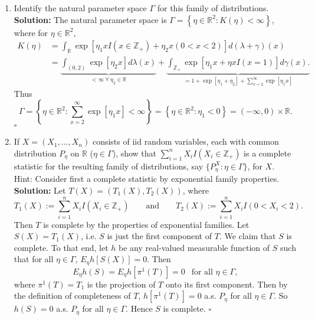 \documentclass[12pt]{article}
\newcounter{ProofCounter}
\newenvironment{Solution}{\stepcounter{ProofCounter}\textbf{Solution:}}{\hfill$\square$}
\begin{document}
\begin{enumerate}[leftmargin=0cm, itemindent=0cm]
\begin{enumerate}
\item Identify the natural parameter space $\Gamma$  for this family of distributions.\\

  \begin{Solution}
    The natural parameter space is $\Gamma = \left\{ \eta \in \mathbb{R}^{2} : K(\eta) < \infty \right\}$, where for $\eta \in \mathbb{R}^{2}$,
    \begin{align*}
      K(\eta) & = \int_{\mathbb{R}}\exp\left[ \eta_1 xI(x \in \mathbb{Z}_+) + \eta_2 x \left( 0 < x < 2\right)\right]d(\lambda + \gamma)(x) \\
      & = \underbrace{\int_{(0,2)}\exp\left[ \eta_2x \right]d\lambda(x)}_{< \infty \ \forall \ \eta_2 \in \mathbb{R}} + 
      \underbrace{\int_{\mathbb{Z}_+}\exp\left[ \eta_1x + \eta xI(x = 1) \right]d\gamma(x). }_{ = 1 + \exp\left[ \eta_1 + \eta_2 \right] +
      \sum_{x=2}^{\infty}\exp[\eta_1x]}
    \end{align*}
    Thus 
    \[ 
      \Gamma = \left\{ \eta \in \mathbb{R}^{2} : \sum_{x=2}^{\infty}\exp\left[ \eta_1 x \right] < \infty \right\} = 
      \left\{ \eta \in \mathbb{R}^{2} : \eta_1 < 0 \right\} = (-\infty, 0) \times \mathbb{R}.
    \]
  \end{Solution}


\item If $X=(X_1,\ldots,X_n)$ consists of iid random variables, each with common distribution $P_\eta$ on $ \mathbb{R}$ ($\eta \in \Gamma$), show that $\sum_{i=1}^n X_i I(X_i \in \mathbb{Z}_+)$ is a complete statistic for the resulting family of distributions, say $\{P^X_\eta: \eta \in \Gamma\}$, for $X$.\\
Hint: Consider first a complete statistic by exponential family properties. \\

\begin{Solution}
  Let $T(X) = (T_1(X), T_2(X))$, where 
  \[
    T_1(X) := \sum_{i=1}^{n}X_iI(X_i \in \mathbb{Z}_+) \qquad \text{and} \qquad T_2(X) := \sum_{i=1}^{n}X_iI(0 < X_i < 2).
  \]
  Then $T$ is complete by the properties of exponential families. Let $S(X) = T_1(X)$, i.e. $S$ is just the first component of $T$. We claim that $S$
  is complete. To that end, let $h$ be any real-valued measurable function of $S$ such that for all $\eta \in \Gamma$, $E_{\eta}h[S(X)] = 0$. Then 
  \[
    E_{\eta}h(S) = E_{\eta}h[\pi^{1}(T)] = 0 \ \ \text{ for all } \eta \in \Gamma,
  \]
  where $\pi^{1}(T) = T_1$ is the projection of $T$ onto its first component. Then by the definition of completeness of $T$, $h[\pi^{1}(T)] = 0$ a.s.
  $P_{\eta}$ for all $\eta \in \Gamma$.
  So $h(S) = 0$ a.s. $P_{\eta}$ for all $\eta \in \Gamma$. Hence $S$ is complete.
\end{Solution}


\end{enumerate}
\end{enumerate}
\end{document}
